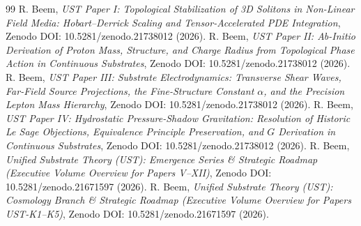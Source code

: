 \documentclass[11pt,a4paper]{article}
\begin{document}
	\begin{thebibliography}{99}
		 R. Beem, \textit{UST Paper I: Topological Stabilization of 3D Solitons in Non-Linear Field Media: Hobart--Derrick Scaling and Tensor-Accelerated PDE Integration}, Zenodo DOI: 10.5281/zenodo.21738012 (2026).
		 R. Beem, \textit{UST Paper II: Ab-Initio Derivation of Proton Mass, Structure, and Charge Radius from Topological Phase Action in Continuous Substrates}, Zenodo DOI: 10.5281/zenodo.21738012 (2026).
		 R. Beem, \textit{UST Paper III: Substrate Electrodynamics: Transverse Shear Waves, Far-Field Source Projections, the Fine-Structure Constant $\alpha$, and the Precision Lepton Mass Hierarchy}, Zenodo DOI: 10.5281/zenodo.21738012 (2026).
		 R. Beem, \textit{UST Paper IV: Hydrostatic Pressure-Shadow Gravitation: Resolution of Historic Le Sage Objections, Equivalence Principle Preservation, and $G$ Derivation in Continuous Substrates}, Zenodo DOI: 10.5281/zenodo.21738012 (2026).
		 R. Beem, \textit{Unified Substrate Theory (UST): Emergence Series \& Strategic Roadmap (Executive Volume Overview for Papers V--XII)}, Zenodo DOI: 10.5281/zenodo.21671597 (2026).
		 R. Beem, \textit{Unified Substrate Theory (UST): Cosmology Branch \& Strategic Roadmap (Executive Volume Overview for Papers UST-K1--K5)}, Zenodo DOI: 10.5281/zenodo.21671597 (2026).
	\end{thebibliography}
	
\end{document}
